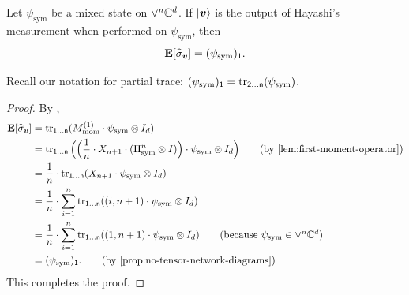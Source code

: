 \documentclass{article}
\newcommand{\reg}[1]{\mathsf{#1}}
\begin{document}
\begin{lemma}\label{lem:first-moment-gps}
    Let $\psi_{\mathrm{sym}}$ be a mixed state on $\lor^n \mathbb C^d$.
    If $\ket{\boldsymbol{v}}$ is the output of Hayashi's measurement when performed on $\psi_{\mathrm{sym}}$, then
    \begin{equation*}
        \E[\widehat{\sigma}_{\bv}] = (\psi_{\mathrm{sym}})_{\reg{1}}.
    \end{equation*}
\end{lemma}
\noindent Recall our notation for partial trace: $(\psi_{\mathrm{sym}})_{\reg{1}} = \tr_{\reg{2}\dots\reg{n}}(\psi_{\mathrm{sym}})$.
\begin{proof}
By ,
\begin{align*}
    \E[\widehat{\sigma}_{\bv}]
    &= \tr_{\reg{1}\dots\reg{n}}(M_{\mathrm{mom}}^{(1)} \cdot \psi_{\mathrm{sym}} \otimes I_d)\\
    &= \tr_{\reg{1}\dots\reg{n}}\Big(\Big(\frac{1}{n} \cdot X_{n+1} \cdot (\Pi_{\mathrm{sym}}^n \otimes I)\Big) \cdot \psi_{\mathrm{sym}} \otimes I_d\Big) \tag{by \Cref{lem:first-moment-operator}}\\
    &= \frac{1}{n} \cdot \tr_{\reg{1}\dots\reg{n}}(X_{n+1} \cdot \psi_{\mathrm{sym}} \otimes I_d)\\
    &= \frac{1}{n} \cdot \sum_{i=1}^n \tr_{\reg{1}\dots\reg{n}}((i, n+1) \cdot \psi_{\mathrm{sym}} \otimes I_d)\\
    &= \frac{1}{n} \cdot \sum_{i=1}^n \tr_{\reg{1}\dots\reg{n}}((1, n+1) \cdot \psi_{\mathrm{sym}} \otimes I_d) \tag{because $\psi_{\mathrm{sym}} \in \lor^n \C^d$} \\
    &= (\psi_{\mathrm{sym}})_{\reg{1}}. \tag{by \Cref{prop:no-tensor-network-diagrams}}
\end{align*}
This completes the proof.
\end{proof}
\end{document}
